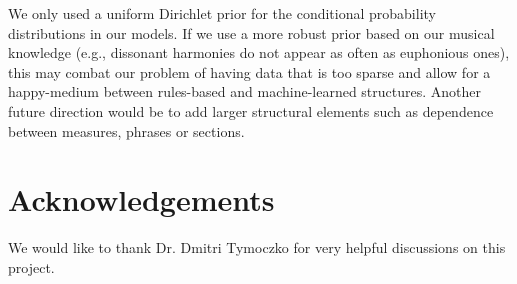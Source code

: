 \documentclass[11pt]{article}
\begin{document}
We only used a uniform Dirichlet prior for the conditional probability distributions in our models. If we use a more robust prior based on our musical knowledge (e.g., dissonant harmonies do not appear as often as euphonious ones), this may combat our problem of having data that is too sparse and allow for a happy-medium between rules-based and machine-learned structures. Another future direction would be to add larger structural elements such as dependence between measures, phrases or sections. 


\section*{Acknowledgements}
We would like to thank Dr.  Dmitri Tymoczko for very helpful discussions on this project. 


\clearpage
\end{document}
